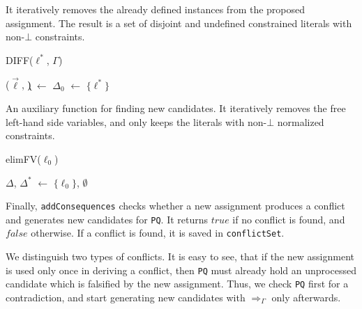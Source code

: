\documentclass[a4paper]{article}
\begin{document}
It iteratively removes the already defined instances from the proposed assignment. 
The result is a set of disjoint and undefined constrained literals with non-$\bot$ constraints.
\begin{function}
	
	\caption{DIFF($\ell^*$, $\Gamma$)}
	($\vec{\ell}$, \k) $\gets$ \UNIF{$\ell^*$, $\Gamma$}\;
	$\Delta_0$ $\gets$ $\{\ell^*\}$\;
	\;
\end{function}
An auxiliary function for finding new candidates. 
It iteratively removes the free left-hand side variables, and only keeps the 
literals with non-$\bot$ normalized constraints.
\begin{function}
	
	\caption{elimFV($\ell_0$)}
	$\Delta$, $\Delta^*$ $\gets$ $\{\ell_0\}$, $\emptyset$\;
	\KwRet{$\Delta^*$}
\end{function}
Finally, \texttt{addConsequences} checks whether a new assignment produces a conflict and generates new 
candidates for \texttt{PQ}. It returns $true$ if no conflict is found, and $false$ otherwise. 
If a conflict is found, it is saved in \texttt{conflictSet}. 

We distinguish two types of conflicts.
It is easy to see, that if the new assignment is used only once in deriving a conflict, then 
\texttt{PQ} must already hold an unprocessed candidate which is falsified by the new assignment.
Thus, we check \texttt{PQ} first for a contradiction, and start generating new candidates with $\Rightarrow_{\Gamma}$
only afterwards.
\end{document}
